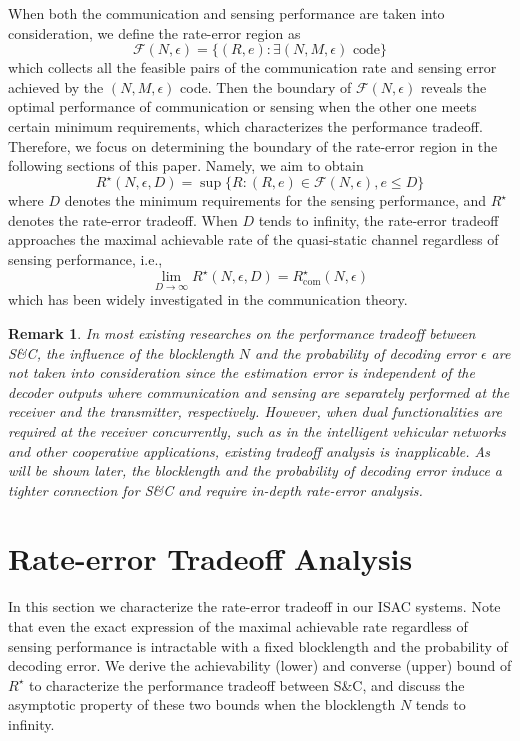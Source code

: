 \documentclass[conference,a4paper]{IEEEtran}
\newtheorem{remark}{Remark}
\begin{document}
When both the communication and sensing performance are taken into consideration, we define the rate-error region as
\begin{equation}
\mathcal{F}(N,\epsilon) = \bigg\{(R,e):\exists(N, M, \epsilon) \text { code}\bigg\}
\end{equation}
which collects all the feasible pairs of the communication rate and sensing error achieved by the $(N,M,\epsilon)$ code. Then the boundary of $\mathcal{F}(N,\epsilon)$ reveals the optimal performance of communication or sensing when the other one meets certain minimum requirements, which characterizes the performance tradeoff. Therefore, we focus on determining the boundary of the rate-error region in the following sections of this paper. Namely, we aim to obtain
\begin{equation}
    R^\star(N,\epsilon,D) = \sup\bigg\{R:(R,e)\in \mathcal{F}(N,\epsilon), e\leq D\bigg\}
\end{equation}
where $D$ denotes the minimum requirements for the sensing performance, and $R^\star$ denotes the rate-error tradeoff. When $D$ tends to infinity, the rate-error tradeoff approaches the maximal achievable rate of the quasi-static channel regardless of sensing performance, i.e., 
\begin{equation}
\lim_{D\to\infty} R^\star(N,\epsilon,D) = R_\mathrm{com}^\star(N,\epsilon)
\end{equation}
which has been widely investigated in the communication theory\cite{PolPooVer:J10,YanDurKoc:C13,YanDurKoc:J10}.

\begin{remark}
    In most existing researches on the performance tradeoff between S\&C, the influence of the blocklength $N$ and the probability of decoding error $\epsilon$ are not taken into consideration since the estimation error is independent of the decoder outputs where communication and sensing are separately performed at the receiver and the transmitter, respectively\cite{AhmKobWig:J22,ChaMoeHim:J17,XioLiuCui:J22}. However, when dual functionalities are required at the receiver concurrently, such as in the intelligent vehicular networks and other cooperative applications, existing tradeoff analysis is inapplicable. As will be shown later, the blocklength and the probability of decoding error induce a tighter connection for S\&C and require in-depth rate-error analysis.
\end{remark}

\section{Rate-error Tradeoff Analysis}
In this section we characterize the rate-error tradeoff in our ISAC systems. Note that even the exact expression of the maximal achievable rate regardless of sensing performance is intractable with a fixed blocklength and the probability of decoding error. We derive the achievability (lower) and converse (upper) bound of $R^\star$ to characterize the performance tradeoff between S\&C, and discuss the asymptotic property of these two bounds when the blocklength $N$ tends to infinity.
\end{document}
